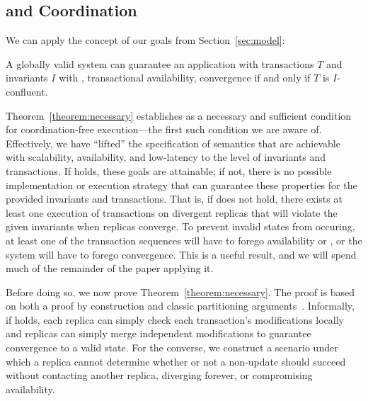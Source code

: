 \subsection{\iconfluence and Coordination}

We can apply the concept of \iconfluence our goals from
Section~\ref{sec:model}:

\begin{theorem}
\label{theorem:necessary}
A globally valid system can guarantee an application with transactions
$T$ and invariants $I$ with \cfreedom, transactional availability,
convergence if and only if $T$ is $I$-confluent.
\end{theorem}

Theorem~\ref{theorem:necessary} establishes \iconfluence as a
necessary and sufficient condition for coordination-free
execution---the first such condition we are aware of. Effectively, we
have ``lifted'' the specification of semantics that are achievable
with scalability, availability, and low-latency to the level of
invariants and transactions. If \iconfluence holds, these goals are
attainable; if not, there is no possible implementation or execution
strategy that can guarantee these properties for the provided
invariants and transactions. That is, if \iconfluence does not hold,
there exists at least one execution of transactions on divergent
replicas that will violate the given invariants when replicas
converge. To prevent invalid states from occuring, at least one of the
transaction sequences will have to forego availability or \cfreedom,
or the system will have to forego convergence. This is a useful
result, and we will spend much of the remainder of the paper applying
it.

Before doing so, we now prove Theorem~\ref{theorem:necessary}. The
proof is based on both a proof by construction and classic
partitioning arguments~\cite{gilbert-cap}. Informally, if \iconfluence
holds, each replica can simply check each transaction's modifications
locally and replicas can simply merge independent modifications to
guarantee convergence to a valid state. For the converse, we construct
a scenario under which a replica cannot determine whether or not a
non-\iconfluent update should succeed without contacting another
replica, diverging forever, or compromising availability.

